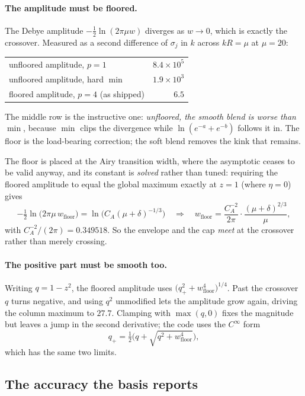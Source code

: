 \documentclass[11pt]{article}
\theoremstyle{remark}
\begin{document}
\paragraph{The amplitude must be floored.} The Debye amplitude
$-\tfrac12\ln(2\pi\mu w)$ diverges as $w\to0$, which is exactly the crossover. Measured as a
second difference of $\sigma_j$ in $k$ across $kR=\mu$ at $\mu=20$:
\begin{center}
\begin{tabular}{lr}
\toprule
unfloored amplitude, $p=1$ & $8.4\times10^{5}$\\
unfloored amplitude, hard $\min$ & $1.9\times10^{3}$\\
floored amplitude, $p=4$ (as shipped) & $6.5$\\
\bottomrule
\end{tabular}
\end{center}
The middle row is the instructive one: \emph{unfloored, the smooth blend is worse than
$\min$}, because $\min$ clips the divergence while $\ln(e^{-a}+e^{-b})$ follows it in. The
floor is the load-bearing correction; the soft blend removes the kink that remains.

The floor is placed at the Airy transition width, where the asymptotic ceases to be valid
anyway, and its constant is \emph{solved} rather than tuned: requiring the floored amplitude
to equal the global maximum exactly at $z=1$ (where $\eta=0$) gives
\[
  -\tfrac12\ln\big(2\pi\mu\,w_{\text{floor}}\big) = \ln\!\big(C_A(\mu+\delta)^{-1/3}\big)
  \quad\Longrightarrow\quad
  w_{\text{floor}} = \frac{C_A^{-2}}{2\pi}\cdot\frac{(\mu+\delta)^{2/3}}{\mu},
\]
with $C_A^{-2}/(2\pi)=0.349518$. So the envelope and the cap \emph{meet} at the crossover
rather than merely crossing.

\paragraph{The positive part must be smooth too.} Writing $q=1-z^2$, the floored amplitude
uses $\big(q_+^2+w_{\text{floor}}^4\big)^{1/4}$. Past the crossover $q$ turns negative, and
using $q^2$ unmodified lets the amplitude grow again, driving the column maximum to $27.7$.
Clamping with $\max(q,0)$ fixes the magnitude but leaves a jump in the second derivative;
the code uses the $C^\infty$ form
\[
  q_+ = \tfrac12\Big(q+\sqrt{q^2+w_{\text{floor}}^4}\Big),
\]
which has the same two limits.

\subsection{The accuracy the basis reports}
\end{document}
